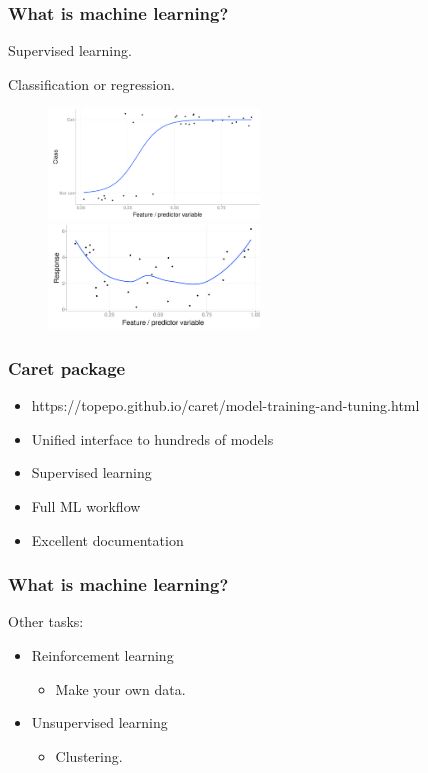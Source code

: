 \documentclass[handout, aspectratio = 169]{beamer}
\begin{document}
\begin{frame}
\frametitle{What is machine learning?}
Supervised learning.

Classification or regression.
\begin{figure}
    \includegraphics[width = 0.5\textwidth]{classification}%
    \includegraphics[width = 0.5\textwidth]{regression}
\end{figure} 

\end{frame} 


\begin{frame}
\frametitle{Caret package}
\begin{itemize}
\item https://topepo.github.io/caret/model-training-and-tuning.html
\item Unified interface to hundreds of models
\item Supervised learning
\item Full ML workflow
\item Excellent documentation
\end{itemize}

\end{frame} 


\begin{frame}
\frametitle{What is machine learning?}
Other tasks:
\begin{itemize}
\item Reinforcement learning
\begin{itemize}
\item Make your own data.
\end{itemize}
\item Unsupervised learning
\begin{itemize}
\item Clustering.
\end{itemize}
\end{itemize}
\end{frame} 
\end{document}
